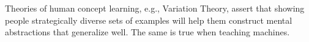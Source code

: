 \documentclass[justified]{tufte-handout}
\begin{document}




Theories of human concept learning, e.g., Variation Theory,\cite{vt} assert that showing people strategically diverse sets of examples will help them construct mental abstractions that generalize well. The same is true when teaching machines. 
\end{document}

